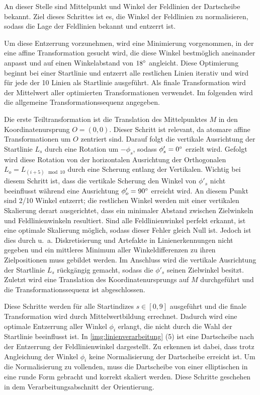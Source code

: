 An dieser Stelle sind Mittelpunkt und Winkel der Feldlinien der Dartscheibe bekannt. Ziel dieses Schrittes ist es, die Winkel der Feldlinien zu normalisieren, sodass die Lage der Feldlinien bekannt und entzerrt ist.

Um diese Entzerrung vorzunehmen, wird eine Minimierung vorgenommen, in der eine affine Transformation gesucht wird, die diese Winkel bestmöglich aneinander anpasst und auf einen Winkelabstand von $18^{\circ}$ angleicht. Diese Optimierung beginnt bei einer Startlinie und entzerrt alle restlichen Linien iterativ und wird für jede der 10 Linien als Startlinie ausgeführt. Als finale Transformation wird der Mittelwert aller optimierten Transformationen verwendet. Im folgenden wird die allgemeine Transformationssequenz angegeben.

Die erste Teiltransformation ist die Translation des Mittelpunktes $M$ in den Koordinatenursprung $O =(0, 0)$. Dieser Schritt ist relevant, da atomare affine Transformationen um $O$ zentriert sind. Darauf folgt die vertikale Ausrichtung der Startlinie $L_s$ durch eine Rotation um $-\phi_s$, sodass $\phi'_s = 0^{\circ}$ erzielt wird. Gefolgt wird diese Rotation von der horizontalen Ausrichtung der Orthogonalen $L_o = L_{(i+5) \mod 10}$ durch eine Scherung entlang der Vertikalen. Wichtig bei diesem Schritt ist, dass die vertikale Scherung den Winkel von $\phi'_s$ nicht beeinflusst während eine Ausrichtung $\phi'_o = 90^{\circ}$ erreicht wird. An diesem Punkt sind 2/10 Winkel entzerrt; die restlichen Winkel werden mit einer vertikalen Skalierung derart ausgerichtet, dass ein minimaler Abstand zwischen Zielwinkeln und Feldlinienwinkeln resultiert. Sind alle Feldlinienwinkel perfekt erkannt, ist eine optimale Skalierung möglich, sodass dieser Fehler gleich Null ist. Jedoch ist dies durch u.\ a. Diskretisierung und Artefakte in Linienerkennungen nicht gegeben und ein mittleres Minimum aller Winkeldifferenzen zu ihren Zielpositionen muss gebildet werden. Im Anschluss wird die vertikale Ausrichtung der Startlinie $L_s$ rückgängig gemacht, sodass die $\phi'_s$ seinen Zielwinkel besitzt. Zuletzt wird eine Translation des Koordinatenursprungs auf $M$ durchgeführt und die Transformationssequenz ist abgeschlossen.

Diese Schritte werden für alle Startindizes $s \in [0, 9]$ ausgeführt und die finale Transformation wird durch Mittelwertbildung errechnet. Dadurch wird eine optimale Entzerrung aller Winkel $\phi_i$ erlangt, die nicht durch die Wahl der Startlinie beeinflusst ist. In \autoref{img:linienverarbeitung} (5) ist eine Dartscheibe nach der Entzerrung der Feldlinienwinkel dargestellt. Zu erkennen ist dabei, dass trotz Angleichung der Winkel $\phi_i$ keine Normalisierung der Dartscheibe erreicht ist. Um die Normalisierung zu vollenden, muss die Dartscheibe von einer elliptischen in eine runde Form gebracht und korrekt skaliert werden. Diese Schritte geschehen in dem Verarbeitungsabschnitt der Orientierung.

